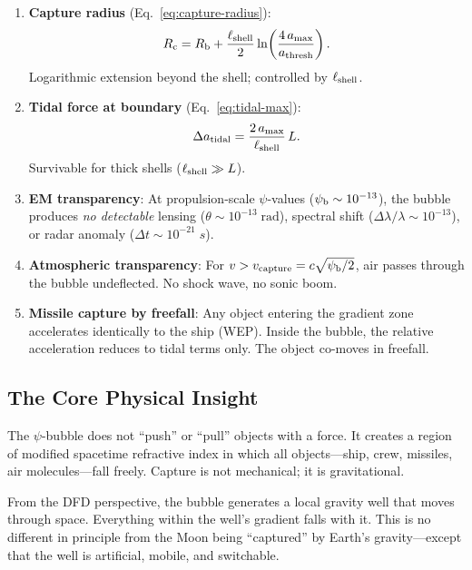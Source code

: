 \documentclass[12pt,aps,prd,superscriptaddress,nofootinbib]{revtex4-2}
\newcommand{\psib}{\psi_{\rm b}}
\newcommand{\Rb}{R_{\rm b}}
\newcommand{\Rc}{R_{\rm c}}
\newcommand{\Lshell}{\ell_{\rm shell}}
\begin{document}
\begin{enumerate}
\item \textbf{Capture radius}
(Eq.~\ref{eq:capture-radius}):
\begin{equation*}
\Rc = \Rb + \frac{\Lshell}{2}\ln\!\left(
  \frac{4\,a_{\rm max}}{a_{\rm thresh}}\right).
\end{equation*}
Logarithmic extension beyond the shell; controlled by
$\Lshell$.

\item \textbf{Tidal force at boundary}
(Eq.~\ref{eq:tidal-max}):
\begin{equation*}
\Delta a_{\rm tidal} = \frac{2\,a_{\rm max}}{\Lshell}\,L.
\end{equation*}
Survivable for thick shells ($\Lshell \gg L$).

\item \textbf{EM transparency}: At propulsion-scale
$\psi$-values ($\psib \sim 10^{-13}$), the bubble produces
\emph{no detectable} lensing ($\theta \sim 10^{-13}\;\text{rad}$),
spectral shift ($\Delta\lambda/\lambda \sim 10^{-13}$),
or radar anomaly ($\Delta t \sim 10^{-21}\;\si{s}$).

\item \textbf{Atmospheric transparency}: For $v > v_{\rm capture}
= c\sqrt{\psib/2}$, air passes through the bubble undeflected.
No shock wave, no sonic boom.

\item \textbf{Missile capture by freefall}: Any object entering
the gradient zone accelerates identically to the ship (WEP).
Inside the bubble, the relative acceleration reduces to tidal
terms only. The object co-moves in freefall.
\end{enumerate}

\subsection{The Core Physical Insight}

The $\psi$-bubble does not ``push'' or ``pull'' objects with a
force. It creates a region of modified spacetime refractive index
in which all objects---ship, crew, missiles, air molecules---fall
freely. Capture is not mechanical; it is gravitational.

From the DFD perspective, the bubble generates a local gravity well
that moves through space. Everything within the well's gradient
falls with it. This is no different in principle from the Moon
being ``captured'' by Earth's gravity---except that the well is
artificial, mobile, and switchable.
\end{document}
